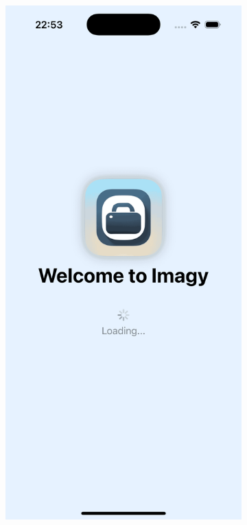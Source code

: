 \documentclass[a4paper]{article}
\begin{document}
\begin{figure}[H]
    \centering
    \begin{subfigure}{0.2\textwidth}
        \centering
        \includegraphics[width=\linewidth]{images/loading.png}

\end{subfigure}
\end{figure}
\end{document}
